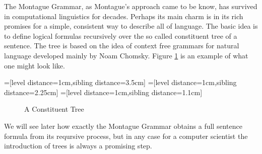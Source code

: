 \documentclass[12pt]{article}
\begin{document}
The Montague Grammar, as Montague's approach came to be know, has survived in computational linguistics for decades. Perhaps its main charm is in its rich promises for a simple, consistent way to describe all of language. The basic idea is to define logical formulas recursively over the so called constituent tree of a sentence. The tree is based on the idea of context free grammars for natural language developed mainly by Noam Chomsky\cite{chomsky2002syntactic}. Figure \ref{fig:const_tree} is an example of what one might look like.

=[level distance=1cm,sibling distance=3.5cm]
=[level distance=1cm,sibling distance=2.25cm]
=[level distance=1cm,sibling distance=1.1cm]
\begin{figure}
\centering
{}
\caption{A Constituent Tree} \label{fig:const_tree}
\end{figure}

We will see later how exactly the Montague Grammar obtains a full sentence formula from its reqursive process, but in any case for a computer scientist the introduction of trees is always a promising step.
\end{document}

